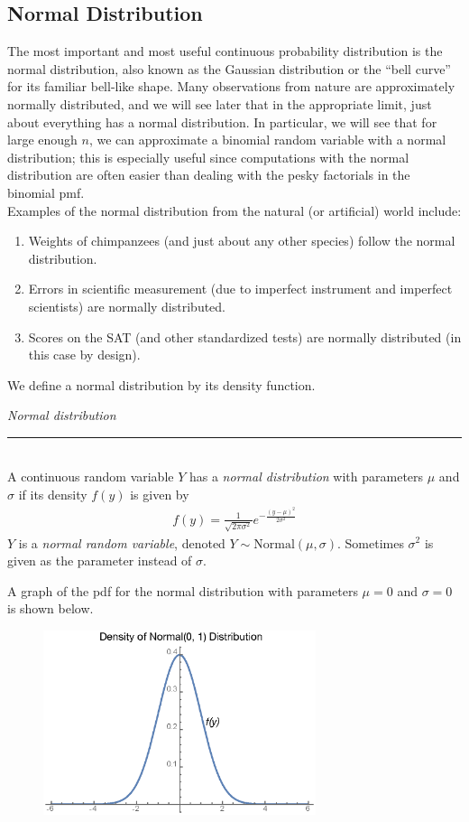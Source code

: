 \documentclass[12pt]{article}
\theoremstyle{definition}
\theoremstyle{remark}
\begin{document}

\subsection{Normal Distribution}
The most important and most useful continuous probability distribution is the normal distribution, also known as the Gaussian distribution or the ``bell curve'' for its familiar bell-like shape. Many observations from nature are approximately normally distributed, and we will see later that in the appropriate limit, just about everything has a normal distribution. In particular, we will see that for large enough $n$, we can approximate a binomial random variable with a normal distribution; this is especially useful since computations with the normal distribution are often easier than dealing with the pesky factorials in the binomial pmf.\\

Examples of the normal distribution from the natural (or artificial) world include:
\begin{enumerate}
\item Weights of chimpanzees (and just about any other species) follow the normal distribution.
\item Errors in scientific measurement (due to imperfect instrument and imperfect scientists) are normally distributed.
\item Scores on the SAT (and other standardized tests) are normally distributed (in this case by design).
\end{enumerate}

We define a normal distribution by its density function.

\begin{framed}
\emph{Normal distribution}\\
  \rule{\dimexpr{}\fboxrule}{.1pt} \\
A continuous random variable $Y$ has a \emph{normal distribution} with parameters $\mu$ and $\sigma$ if its density $f(y)$ is given by
\begin{align*}
f(y) = \frac{1}{\sqrt{2 \pi \sigma^2}} e^{-\frac{(y - \mu)^2}{2 \sigma^2}}
\end{align*}
$Y$ is a \emph{normal random variable}, denoted $Y \sim \text{Normal}(\mu, \sigma)$. Sometimes $\sigma^2$ is given as the parameter instead of $\sigma$.
\end{framed}

A graph of the pdf for the normal distribution with parameters $\mu = 0$ and $\sigma = 0$ is shown below.
\begin{figure}[H]
\centering
\includegraphics[width=8cm]{normalpdf2.eps}
\end{figure}
\end{document}
